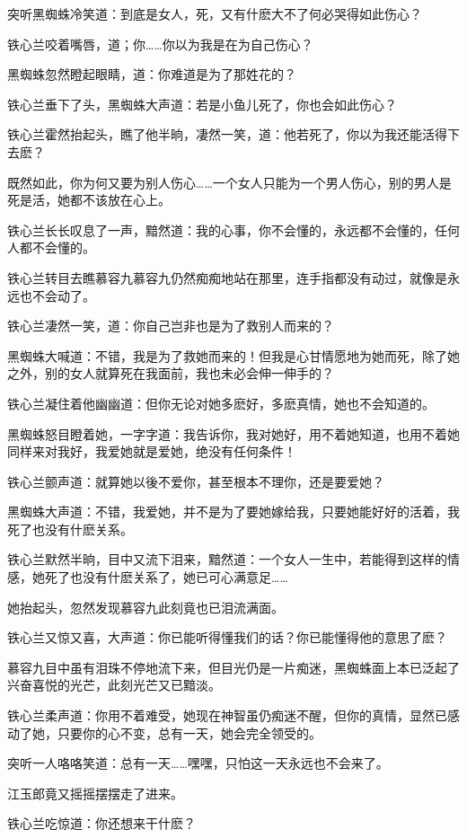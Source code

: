 \documentclass[12pt,oneside]{book}
\begin{document}
突听黑蜘蛛冷笑道：到底是女人，死，又有什麽大不了何必哭得如此伤心？

铁心兰咬着嘴唇，道；你\ldots\ldots 你以为我是在为自己伤心？

黑蜘蛛忽然瞪起眼睛，道：你难道是为了那姓花的？

铁心兰垂下了头，黑蜘蛛大声道：若是小鱼儿死了，你也会如此伤心？

铁心兰霍然抬起头，瞧了他半晌，凄然一笑，道：他若死了，你以为我还能活得下去麽？

既然如此，你为何又要为别人伤心\ldots\ldots 一个女人只能为一个男人伤心，别的男人是死是活，她都不该放在心上。

铁心兰长长叹息了一声，黯然道：我的心事，你不会懂的，永远都不会懂的，任何人都不会懂的。

铁心兰转目去瞧慕容九慕容九仍然痴痴地站在那里，连手指都没有动过，就像是永远也不会动了。

铁心兰凄然一笑，道：你自己岂非也是为了救别人而来的？

黑蜘蛛大喊道：不错，我是为了救她而来的！但我是心甘情愿地为她而死，除了她之外，别的女人就算死在我面前，我也未必会伸一伸手的？

铁心兰凝住着他幽幽道：但你无论对她多麽好，多麽真情，她也不会知道的。

黑蜘蛛怒目瞪着她，一字字道：我告诉你，我对她好，用不着她知道，也用不着她同样来对我好，我爱她就是爱她，绝没有任何条件！

铁心兰颤声道：就算她以後不爱你，甚至根本不理你，还是要爱她？

黑蜘蛛大声道：不错，我爱她，并不是为了要她嫁给我，只要她能好好的活着，我死了也没有什麽关系。

铁心兰默然半晌，目中又流下泪来，黯然道：一个女人一生中，若能得到这样的情感，她死了也没有什麽关系了，她已可心满意足\ldots\ldots{}

她抬起头，忽然发现慕容九此刻竟也已泪流满面。

铁心兰又惊又喜，大声道：你已能听得懂我们的话？你已能懂得他的意思了麽？

慕容九目中虽有泪珠不停地流下来，但目光仍是一片痴迷，黑蜘蛛面上本已泛起了兴奋喜悦的光芒，此刻光芒又已黯淡。

铁心兰柔声道：你用不着难受，她现在神智虽仍痴迷不醒，但你的真情，显然已感动了她，只要你的心不变，总有一天，她会完全领受的。

突听一人咯咯笑道：总有一天\ldots\ldots 嘿嘿，只怕这一天永远也不会来了。

江玉郎竟又摇摇摆摆走了进来。

铁心兰吃惊道：你还想来干什麽？
\end{document}
